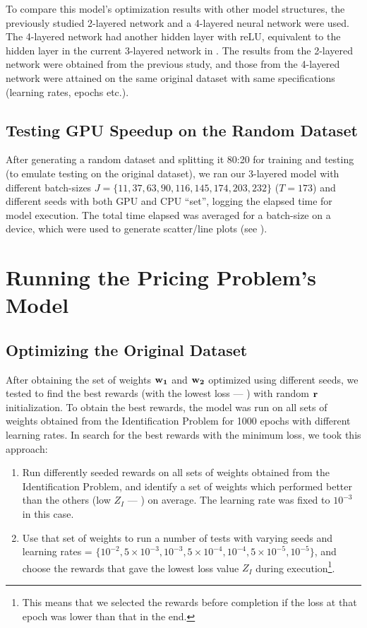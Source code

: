 To compare this model's optimization results with other model structures, the previously studied 2-layered network \cite{Xue2016Avi2} and a 4-layered neural network were used. The 4-layered network had another hidden layer with reLU, equivalent to the hidden layer in the current 3-layered network in . The results from the 2-layered network were obtained from the previous study, and those from the 4-layered network were attained on the same original dataset with same specifications (learning rates, epochs etc.).

\subsection{Testing GPU Speedup on the Random Dataset} \label{sec:Identification Problem-Testing GPU Speedup on the Random Dataset}
After generating a random dataset and splitting it 80:20 for training and testing (to emulate testing on the original dataset), we ran our 3-layered model with different batch-sizes $J = \{11,37,63,90,116,145,174,203,232\}$ ($T = 173$) and different seeds with both GPU and CPU ``set'', logging the elapsed time for model execution. The total time elapsed was averaged for a batch-size on a device, which were used to generate scatter/line plots (see ).

\section{Running the Pricing Problem's Model} \label{sec:Running the Pricing Problem's Model}
\subsection{Optimizing the Original Dataset} \label{sec:Pricing Problem-Optimizing the Original Dataset}
After obtaining the set of weights $\mathbf{w_1}$ and $\mathbf{w_2}$ optimized using different seeds, we tested to find the best rewards (with the lowest loss --- ) with random $\mathbf{r}$ initialization. To obtain the best rewards, the model was run on all sets of weights obtained from the Identification Problem for 1000 epochs with different learning rates. In search for the best rewards with the minimum loss, we took this approach:
\begin{enumerate}
    \item Run differently seeded rewards on all sets of weights obtained from the Identification Problem, and identify a set of weights which performed better than the others (low $Z_I$ --- ) on average. The learning rate was fixed to $10^{-3}$ in this case.
    \item Use that set of weights to run a number of tests with varying seeds and learning rates = $\{10^{-2}, 5 \times 10^{-3}, 10^{-3}, 5 \times 10^{-4}, 10^{-4}, 5 \times 10^{-5}, 10^{-5}\}$, and choose the rewards that gave the lowest loss value $Z_I$ during execution\footnote{This means that we selected the rewards before completion if the loss at that epoch was lower than that in the end.}. 
\end{enumerate}

